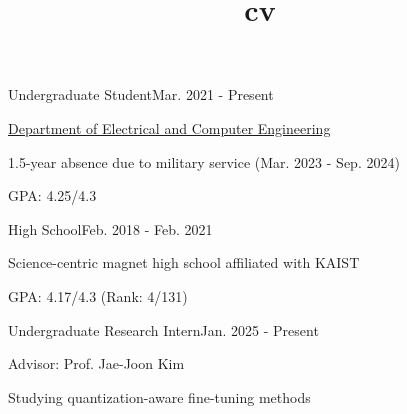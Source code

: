 \documentclass{cv}
\title{cv}
\begin{document}
\cvheader






{Undergraduate Student}{Mar. 2021 - Present}
{
    \item \href{http://ece.snu.ac.kr/en}{Department of Electrical and Computer Engineering}
    \item 1.5-year absence due to military service (Mar. 2023 - Sep. 2024)
    \item GPA: 4.25/4.3
}
{High School}{Feb. 2018 - Feb. 2021}
{
    \item Science-centric magnet high school affiliated with KAIST
    \item GPA: 4.17/4.3 (Rank: 4/131)
}



{Undergraduate Research Intern}{Jan. 2025 - Present}
{
    \item Advisor: Prof. Jae-Joon Kim 
    \item Studying quantization-aware fine-tuning methods
}
\end{document}
